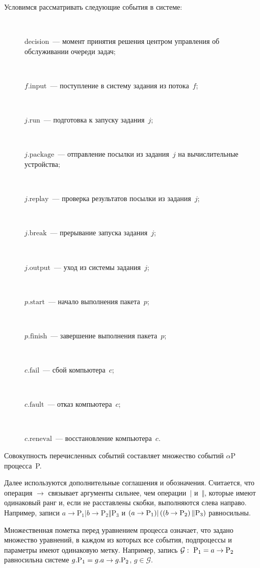 \begin{multicols}{2}
    Условимся рассматривать следующие события в системе:
    \begin{description}
    \item[\,]  decision~--- момент принятия решения центром 
управления об обслуживании очереди задач;
    \item[\,]  $f.{\mathrm{input}}$~--- поступление в систему задания из 
потока~$f$;
    \item[\,] $j.{\mathrm{run}}$~--- подготовка к запуску задания~$j$;
    \item[\,] $j.{\mathrm{package}}$~--- отправление посылки из задания~$j$ 
на вычислительные устройства;
    \item[\,] $j.{\mathrm{replay}}$~--- проверка результатов посылки из 
задания~$j$;
    \item[\,] $j.\mathrm{break}$~--- прерывание запуска задания~$j$;
    \item[\,] $j.\mathrm{output}$~--- уход из системы задания~$j$;
    \item[\,] $p.\mathrm{start}$~--- начало выполнения пакета~$p$;
    \item[\,] $p.\mathrm{finish}$~--- завершение выполнения пакета~$p$;
\item[\,] $c.\mathrm{fail}$~--- сбой компьютера~$c$;
\item[\,] $c.\mathrm{fault}$~--- отказ компьютера~$c$;
    \item[\,] $c.\mathrm{reneval}$~--- восстановление компьютера~$c$.
    \end{description}
    
    Совокупность перечисленных событий со\-став\-ля\-ет множество событий 
$\alpha\mathrm{P}$ процесса~P.
    
    Далее используются дополнительные соглашения и обозначения. 
Считается, что операция $\rightarrow$ связывает аргументы сильнее, чем 
операции~$\vert$ и~$\Vert$, которые имеют одинаковый ранг и, если не 
расставлены скобки, выполняются слева направо. Например, записи
    $
    a\rightarrow \mathrm{P}_1\vert b\rightarrow 
\mathrm{P}_2\Vert\mathrm{P}_3
    $
    и
    $
    (a\hm\rightarrow \mathrm{P}_1)\vert \left(\left(b\hm\rightarrow 
\mathrm{P}_2\right)\Vert \mathrm{P}_3\right)
    $
равносильны.
    
    Множественная пометка перед уравнением процесса означает, что 
задано множество уравнений, в каждом из которых все события, 
подпроцессы и параметры имеют одинаковую метку. Например, запись $\mathcal{G}:\ 
\mathrm{P}_1\hm=a\hm\rightarrow \mathrm{P}_2$ равносильна системе 
$g.\mathrm{P}_1\hm=g.a\hm\rightarrow  g.\mathrm{P}_2$, $g\in \mathcal{G}$.
    

\end{multicols}
